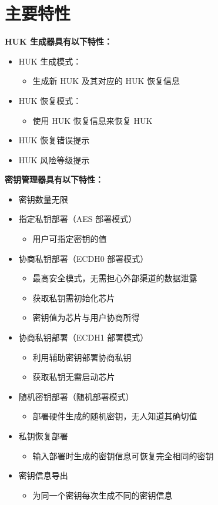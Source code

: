 \documentclass[main\_\_CN.tex]{subfiles}
\begin{document}
\section{主要特性}
\label{sec:keymng-features}
\textbf{HUK 生成器具有以下特性：}
\begin{itemize}
    \item HUK 生成模式：
    \begin{itemize}
        \item 生成新 HUK 及其对应的 HUK 恢复信息
    \end{itemize}
    \item HUK 恢复模式：
    \begin{itemize}
        \item 使用 HUK 恢复信息来恢复 HUK
    \end{itemize}
    \item HUK 恢复错误提示
    \item HUK 风险等级提示
\end{itemize}

\textbf{密钥管理器具有以下特性：}
\begin{itemize}
    \item 密钥数量无限
    \item 指定私钥部署（AES 部署模式）
    \begin{itemize}
        \item 用户可指定密钥的值
    \end{itemize}
    \item 协商私钥部署（ECDH0 部署模式）
    \begin{itemize}
        \item 最高安全模式，无需担心外部渠道的数据泄露
        \item 获取私钥需初始化芯片
        \item 密钥值为芯片与用户协商所得
    \end{itemize}
    \item 协商私钥部署（ECDH1 部署模式）
    \begin{itemize}
        \item 利用辅助密钥部署协商私钥
        \item 获取私钥无需启动芯片
    \end{itemize}
    \item 随机密钥部署（随机部署模式）
    \begin{itemize}
        \item 部署硬件生成的随机密钥，无人知道其确切值
    \end{itemize}
    \item 私钥恢复部署
    \begin{itemize}
        \item 输入部署时生成的密钥信息可恢复完全相同的密钥
    \end{itemize}
    \item 密钥信息导出
    \begin{itemize}
        \item 为同一个密钥每次生成不同的密钥信息
    \end{itemize}
\end{itemize}
\end{document}
